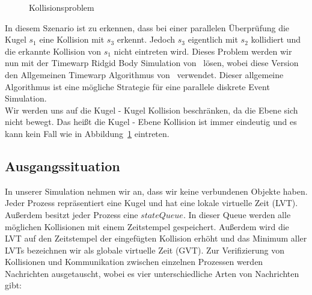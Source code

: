 \documentclass[a4paper, 10pt, openright, parskip, chapterprefix]{scrreprt}
\begin{document}
\begin{figure}[h!]
\centering{}
\caption{Kollisionsproblem}
\label{abb:kollision}
\end{figure}

In diesem Szenario ist zu erkennen, dass bei einer parallelen Überprüfung die Kugel $s_1$ eine Kollision mit $s_3$ erkennt. Jedoch $s_3$ eigentlich mit $s_2$ kollidiert und die erkannte Kollision von $s_1$ nicht eintreten wird.  Dieses Problem werden wir nun mit der Timewarp Ridgid Body Simulation von~\cite{timewarp} lösen, wobei diese Version den Allgemeinen Timewarp Algorithmus von~\cite{jefferson} verwendet. Dieser allgemeine Algorithmus ist eine mögliche Strategie für eine parallele diskrete Event Simulation.\\
Wir werden uns auf die Kugel - Kugel Kollision beschränken, da die Ebene sich nicht bewegt. Das heißt die Kugel - Ebene Kollision ist immer eindeutig und es kann kein Fall wie in Abbildung~\ref{abb:kollision} eintreten. 

\subsection{Ausgangssituation}
In unserer Simulation nehmen wir an, dass wir keine verbundenen Objekte haben. Jeder Prozess repräsentiert eine Kugel und hat eine lokale virtuelle Zeit (LVT). Außerdem besitzt jeder Prozess eine $stateQueue$. In dieser Queue werden alle möglichen Kollisionen mit einem Zeitstempel gespeichert.  Außerdem wird die LVT auf den Zeitstempel der eingefügten Kollision erhöht und das Minimum aller LVTs bezeichnen wir als globale virtuelle Zeit (GVT). Zur Verifizierung  von Kollisionen und Kommunikation zwischen einzelnen Prozessen werden Nachrichten ausgetauscht, wobei es vier unterschiedliche Arten von Nachrichten gibt:
\end{document}
